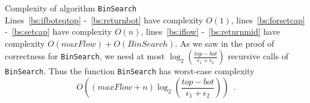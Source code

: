 \begin{sepproof}{Complexity of algorithm \texttt{BinSearch}} \ \\
  Lines~\ref{bs:ifboteqtop} -~\ref{bs:returnbot} have complexity $O\left(1\right)$, lines~\ref{bs:forsetcap}
  -~\ref{bs:setcap} have complexity $O\left(n\right)$, lines~\ref{bs:iflow} -~\ref{bs:returnmid} have complexity
  $O\left(maxFlow\right) + O\left(BinSearch\right)$. As we saw in the proof of correctness for \texttt{BinSearch}, we need
  at most $\log_2\left(\frac{top - bot}{\epsilon_1 + \epsilon_2}\right)$ recursive calls of \texttt{BinSearch}. Thus the
  function \texttt{BinSearch} has worst-case complexity
  \begin{equation*}
    O\left(\left(maxFlow + n\right)\log_2\left(\frac{top - bot}{\epsilon_1 + \epsilon_2}\right)\right) \enspace.
  \end{equation*}
\end{sepproof}
